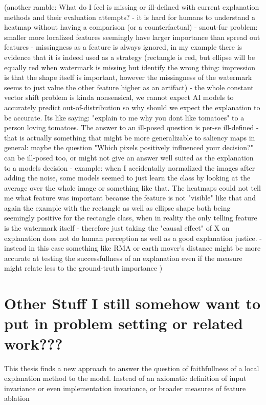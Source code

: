 (another ramble:
What do I feel is missing or ill-defined with current explanation methods and their evaluation attempts?
- it is hard for humans to understand a heatmap without having a comparison (or a counterfactual)
- snout-fur problem: smaller more localized features seemingly have larger importance than spread out features
- missingness as a feature is always ignored, in my example there is evidence that it is indeed used as a strategy (rectangle is red, but ellipse will be equally red when watermark is missing but identify the wrong thing: impression is that the shape itself is important, however the missingness of the watermark seems to just value the other feature higher as an artifact)
- the whole constant vector shift problem is kinda nonsensical, we cannot expect AI models to accurately predict out-of-distribution so why should we expect the explanation to be accurate. Its like saying: "explain to me why you dont like tomatoes" to a person loving tomatoes. The answer to an ill-posed question is per-se ill-defined
- that is actually something that might be more generalizable to saliency maps in general: maybe the question "Which pixels positively influenced your decision?" can be ill-posed too, or might not give an answer well suited as the explanation to a models decision
- example: when I accidentally normalized the images after adding the noise, some models seemed to just learn the class by looking at the average over the whole image or something like that. The heatmaps could not tell me what feature was important because the feature is not "visible" like that
and again the example with the rectangle as well as ellipse shape both being seemingly positive for the rectangle class, when in reality the only telling feature is the watermark itself
- therefore just taking the "causal effect" of X on explanation does not do human perception as well as a good explanation justice.
- instead in this case something like RMA or earth mover's distance might be more accurate at testing the successfullness of an explanation even if the measure might relate less to the ground-truth importance
)

\section{Other Stuff I still somehow want to put in problem setting or related work???}

This thesis finds a new approach to answer the question of faithfullness of a local explanation method to the model. 
Instead of an axiomatic definition of input invariance or even implementation invariance, or broader measures of feature ablation

